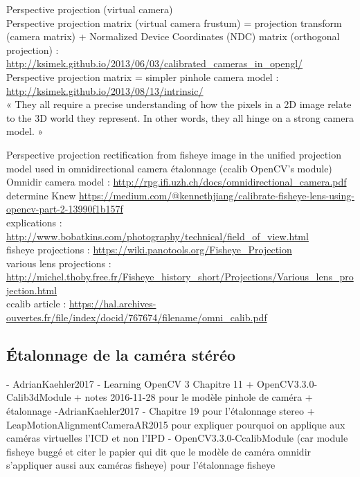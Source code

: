 Perspective projection (virtual camera)\\
Perspective projection matrix (virtual camera frustum) = projection transform (camera matrix) + Normalized Device Coordinates (NDC) matrix (orthogonal projection) : \url{http://ksimek.github.io/2013/06/03/calibrated_cameras_in_opengl/}\\
Perspective projection matrix = simpler pinhole camera model : \url{http://ksimek.github.io/2013/08/13/intrinsic/}\\
« They all require a precise understanding of how the pixels in a 2D image relate to the 3D world they represent. In other words, they all hinge on a strong camera model. »

Perspective projection rectification from fisheye image in the unified projection model used in omnidirectional camera étalonnage (ccalib OpenCV's module)\\
Omnidir camera model : \url{http://rpg.ifi.uzh.ch/docs/omnidirectional_camera.pdf}\\
determine Knew \url{https://medium.com/@kennethjiang/calibrate-fisheye-lens-using-opencv-part-2-13990f1b157f}\\
explications : \url{http://www.bobatkins.com/photography/technical/field_of_view.html}\\
fisheye projections : \url{https://wiki.panotools.org/Fisheye_Projection}\\
various lens projections : \url{http://michel.thoby.free.fr/Fisheye_history_short/Projections/Various_lens_projection.html}\\
ccalib article : \url{https://hal.archives-ouvertes.fr/file/index/docid/767674/filename/omni_calib.pdf}


\subsection{Étalonnage de la caméra stéréo}

- AdrianKaehler2017 - Learning OpenCV 3 Chapitre 11 + OpenCV3.3.0-Calib3dModule + notes 2016-11-28 pour le modèle pinhole de caméra + étalonnage
-AdrianKaehler2017 -  Chapitre 19 pour l'étalonnage stereo + LeapMotionAlignmentCameraAR2015 pour expliquer pourquoi on applique aux caméras virtuelles l'ICD et non l'IPD
- OpenCV3.3.0-CcalibModule (car module fisheye buggé et citer le papier qui dit que le modèle de caméra omnidir s'appliquer aussi aux caméras fisheye) pour l'étalonnage fisheye

